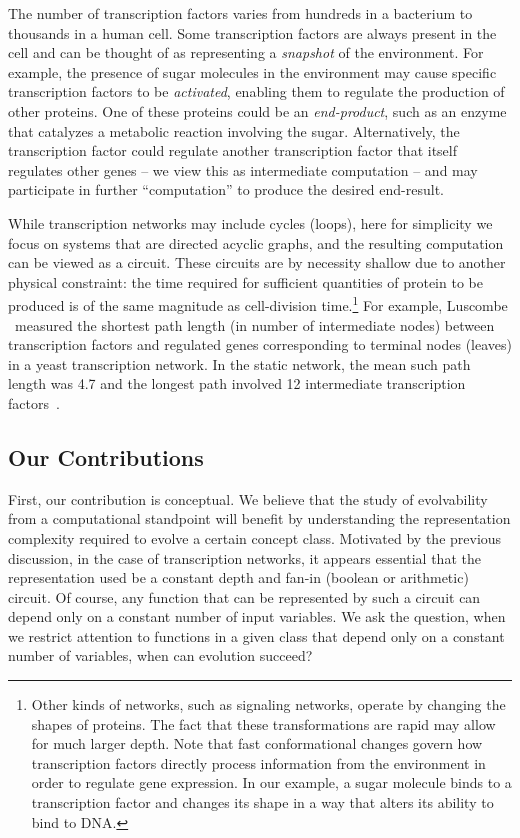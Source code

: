 The number of transcription factors varies from hundreds in a bacterium to
thousands in a human cell. Some transcription factors are always present in the
cell and can be thought of as representing a \emph{snapshot} of the environment.
For example, the presence of sugar molecules in the environment may cause
specific transcription factors to be \emph{activated}, enabling them to regulate
the production of other proteins.  One of these proteins could be an
\emph{end-product}, such as an enzyme that catalyzes a metabolic reaction
involving the sugar. Alternatively, the transcription factor could regulate
another transcription factor that itself
regulates other genes -- we view this as intermediate computation -- and may
participate in further ``computation'' to produce the desired end-result.

While transcription networks may include cycles (loops), here for simplicity we
focus on systems that are directed acyclic graphs, and the resulting computation
can be viewed as a circuit. These circuits are by necessity shallow due to
another physical constraint: the time required for sufficient quantities of
protein to be produced is of the same magnitude as cell-division
time.\footnote{Other kinds of networks, such as signaling networks, operate by
changing the shapes of proteins. The fact that these transformations are rapid may
allow for much larger depth. Note that fast conformational changes govern how
transcription factors directly process information from the environment in order
to regulate gene expression.  In our example, a sugar molecule binds to a
transcription factor and changes its shape in a way that alters its ability to
bind to DNA.}
For example, Luscombe \etal~measured the shortest path length (in number of
intermediate nodes) between transcription factors and regulated genes
corresponding to terminal nodes (leaves) in a yeast transcription network. In
the static network, the mean such path length was 4.7 and the longest path
involved 12 intermediate transcription factors~\cite{Luscombe:2004}.

\subsection{Our Contributions}

First, our contribution is conceptual. We believe that the study of evolvability from
a computational standpoint will benefit by understanding the representation
complexity required to evolve a certain concept class. Motivated by the previous
discussion, in the case of transcription networks, it appears essential that the
representation used be a constant depth and fan-in (boolean or arithmetic)
circuit. Of course, any function that can be represented by such a circuit can
depend only on a constant number of input variables. We ask the
question, when we restrict attention to functions in a given class that depend
only on a constant number of variables, when can evolution succeed?

